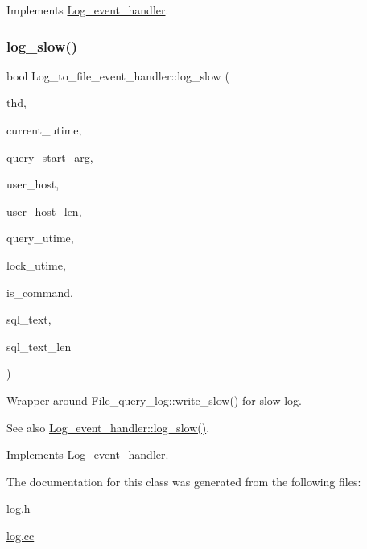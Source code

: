 Implements \mbox{\hyperlink{classLog__event__handler_aa9f98b8c0b48eb846877fe9d2496560e}{Log\+\_\+event\+\_\+handler}}.

\mbox{\label{classLog__to__file__event__handler_ab0454bdadd9f2a600a928c3fa5fd4551}} 
\subsubsection{\texorpdfstring{log\+\_\+slow()}{log\_slow()}}
{\footnotesize\ttfamily bool Log\+\_\+to\+\_\+file\+\_\+event\+\_\+handler\+::log\+\_\+slow (\begin{DoxyParamCaption}\item[{T\+HD $\ast$}]{thd,  }\item[{ulonglong}]{current\+\_\+utime,  }\item[{ulonglong}]{query\+\_\+start\+\_\+arg,  }\item[{const char $\ast$}]{user\+\_\+host,  }\item[{size\+\_\+t}]{user\+\_\+host\+\_\+len,  }\item[{ulonglong}]{query\+\_\+utime,  }\item[{ulonglong}]{lock\+\_\+utime,  }\item[{bool}]{is\+\_\+command,  }\item[{const char $\ast$}]{sql\+\_\+text,  }\item[{size\+\_\+t}]{sql\+\_\+text\+\_\+len }\end{DoxyParamCaption})\hspace{0.3cm}{\ttfamily [virtual]}}

Wrapper around File\+\_\+query\+\_\+log\+::write\+\_\+slow() for slow log. \begin{DoxySeeAlso}{See also}
\mbox{\hyperlink{classLog__event__handler_a4a391622d5b047d66ed8466ffa2af98b}{Log\+\_\+event\+\_\+handler\+::log\+\_\+slow()}}. 
\end{DoxySeeAlso}


Implements \mbox{\hyperlink{classLog__event__handler_a4a391622d5b047d66ed8466ffa2af98b}{Log\+\_\+event\+\_\+handler}}.



The documentation for this class was generated from the following files\+:\begin{DoxyCompactItemize}
\item 
log.\+h\item 
\mbox{\hyperlink{log_8cc}{log.\+cc}}\end{DoxyCompactItemize}
